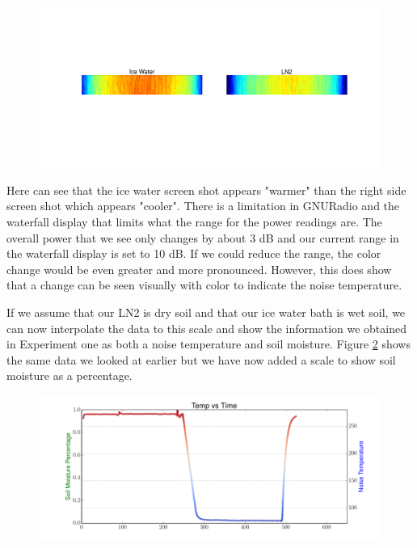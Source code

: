 \begin{figure}[h!tb] \centering

\includegraphics[width=\textwidth]{Experiments/Exp1/waterfall_side.pdf}

\label{side_waterfall}
\end{figure}

Here can see that the ice water screen shot appears "warmer" than the right side screen shot which appears "cooler".  There is a limitation in GNURadio and the waterfall display that limits what the range for the power readings are.  The overall power that we see only changes by about 3 dB and our current range in the waterfall display is set to 10 dB.  If we could reduce the range, the color change would be even greater and more pronounced.  However, this does show that a change can be seen visually with color to indicate the noise temperature.  

If we assume that our LN2 is dry soil and that our ice water bath is wet soil, we can now interpolate the data to this scale and show the information we obtained in Experiment one as both a noise temperature and soil moisture.  Figure \ref{SDR_soil} shows the same data we looked at earlier but we have now added a scale to show soil moisture as a percentage.

\begin{figure}[h!tb] \centering

\includegraphics[width=\textwidth]{Experiments/Exp1/sdr_soilmoisture.pdf}

\label{SDR_soil}
\end{figure}


